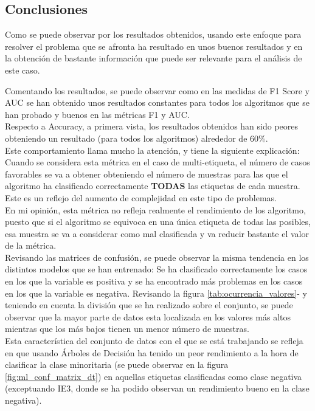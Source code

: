 \subsection{Conclusiones}
Como se puede observar por los resultados obtenidos, usando este enfoque para resolver el problema que se afronta ha resultado en unos buenos resultados y en la obtención de bastante información que puede ser relevante para el análisis de este caso.\linebreak

Comentando los resultados, se puede observar como en las medidas de F1 Score y AUC se han obtenido unos resultados constantes para todos los algoritmos que se han probado y buenos en las métricas F1 y AUC.\\
\linebreak
Respecto a Accuracy, a primera vista, los resultados obtenidos han sido peores obteniendo un resultado (para todos los algoritmos) alrededor de 60\%.\\
Este comportamiento llama mucho la atención, y tiene la siguiente explicación: Cuando se considera esta métrica en el caso de multi-etiqueta, el número de casos favorables se va a obtener obteniendo el número de muestras para las que el algoritmo ha clasificado correctamente \textbf{TODAS} las etiquetas de cada muestra.\\ Este es un reflejo del aumento de complejidad en este tipo de problemas.\\
\linebreak
En mi opinión, esta métrica no refleja realmente el rendimiento de los algoritmo, puesto que si el algoritmo se equivoca en una única etiqueta de todas las posibles, esa muestra se va a considerar como mal clasificada y va reducir bastante el valor de la métrica.\\
\linebreak
Revisando las matrices de confusión, se puede observar la misma tendencia en los distintos modelos que se han entrenado: Se ha clasificado correctamente los casos en los que la variable es positiva y se ha encontrado más problemas en los casos en los que la variable es negativa. Revisando la figura 	\ref{tab:ocurrencia_valores}- y teniendo en cuenta la división que se ha realizado sobre el conjunto, se puede observar que la mayor parte de datos esta localizada en los valores más altos mientras que los más bajos tienen un menor número de muestras.\\
Esta característica del conjunto de datos con el que se está trabajando se refleja en que usando Árboles de Decisión ha tenido un peor rendimiento a la hora de clasificar la clase minoritaria (se puede observar en la figura \ref{fig:ml_conf_matrix_dt}) en aquellas etiquetas clasificadas como clase negativa (exceptuando IE3, donde se ha podido observan un rendimiento bueno en la clase negativa).\\
